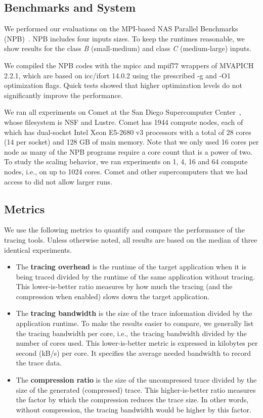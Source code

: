 \subsection{Benchmarks and System}

We performed our evaluations on the MPI-based NAS Parallel Benchmarks (NPB)~\cite{nas}.
%
NPB includes four inputs sizes.
%
To keep the runtimes reasonable, we show results for the class \textit{B} (small-medium) and class \textit{C} (medium-large) inputs.
%

We compiled the NPB codes with the mpicc and mpif77 wrappers of MVAPICH 2.2.1, which are based on icc/ifort 14.0.2 using the prescribed -g and -O1 optimization flags.
%
Quick tests showed that higher optimization levels do not significantly improve the performance.
%

We ran all experiments on Comet at the San Diego Supercomputer Center~\cite{comet}, whose filesystem is NSF and Lustre.
%
Comet has 1944 compute nodes, each of which has dual-socket Intel Xeon E5-2680 v3 processors with a total of 28 cores (14 per socket) and 128 GB of main memory.
%
Note that we only used 16 cores per node as many of the NPB programs require a core count that is a power of two.
%
To study the scaling behavior, we ran experiments on 1, 4, 16 and 64 compute nodes, i.e., on up to 1024 cores. Comet and other supercomputers that we had access to did not allow larger runs.


\subsection{Metrics}

We use the following metrics to quantify and compare the performance of the tracing tools.
%
Unless otherwise noted, all results are based on the median of three identical experiments.
%
\begin{itemize}
\item The \textbf{tracing overhead} is the runtime of the target application when it is being traced divided by the runtime of the same application without tracing.
%
This lower-is-better ratio measures by how much the tracing (and the compression when enabled) slows down the target application.
%
\item The \textbf{tracing bandwidth} is the size of the trace information divided by the application runtime.
%
To make the results easier to compare, we generally list the tracing bandwidth per core, i.e., the tracing bandwidth divided by the number of cores used.
%
This lower-is-better metric is expressed in kilobytes per second (kB/s) per core.
%
It specifies the average needed bandwidth to record the trace data.
%
\item The \textbf{compression ratio} is the size of the uncompressed trace divided by the size of the generated (compressed) trace.
%
This higher-is-better ratio measures the factor by which the compression reduces the trace size.
%
In other words, without compression, the tracing bandwidth would be higher by this factor.
\end{itemize}




